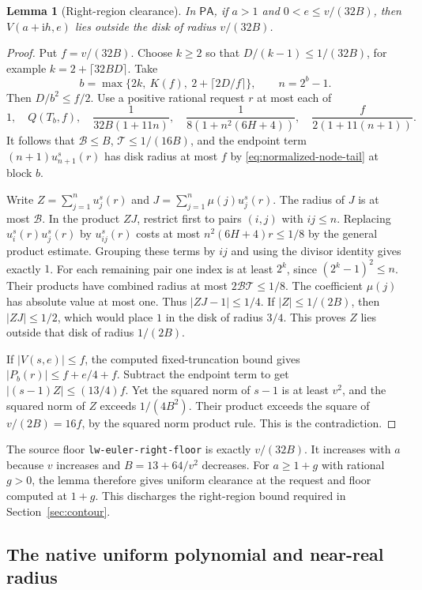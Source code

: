 \documentclass[11pt]{amsart}
\newtheorem{lemma}[theorem]{Lemma}
\theoremstyle{definition}
\theoremstyle{remark}
\numberwithin{equation}{section}
\newcommand{\PA}{\mathsf{PA}}
\newcommand{\code}[1]{\nolinkurl{#1}}
\begin{document}
\begin{lemma}[Right-region clearance]\label{lem:right-clearance}
In $\PA$, if $a>1$ and $0<e\le v/(32B)$, then
$V(a+\mathrm i h,e)$ lies outside the disk of radius $v/(32B)$.
\end{lemma}
\begin{proof}
Put $f=v/(32B)$. Choose $k\ge2$ so that
$D/(k-1)\le1/(32B)$, for example
$k=2+\lceil32BD\rceil$.
Take
\[
 b=\max\{2k,\ K(f),\ 2+\lceil 2D/f\rceil\},\qquad
 n=2^b-1 .
\]
Then $D/b^2\le f/2$. Use a positive rational request $r$
at most each of
\[
 1,\quad Q(T_b,f),\quad
 \frac{1}{32B(1+11n)},\quad
 \frac{1}{8(1+n^2(6H+4))},\quad
 \frac{f}{2(1+11(n+1))}.
\]
It follows that $\mathcal B\le B$, $\mathcal T\le1/(16B)$,
and the endpoint term $(n+1)u_{n+1}^s(r)$ has disk radius
at most $f$ by \eqref{eq:normalized-node-tail} at block $b$.

Write $Z=\sum_{j=1}^n u_j^s(r)$ and
$J=\sum_{j=1}^n\mu(j)u_j^s(r)$. The radius of $J$ is at
most $\mathcal B$. In the product $ZJ$, restrict first to
pairs $(i,j)$ with $ij\le n$. Replacing $u_i^s(r)u_j^s(r)$
by $u_{ij}^s(r)$ costs at most $n^2(6H+4)r\le1/8$ by
the general product estimate. Grouping these terms by $ij$
and using the divisor identity gives exactly $1$.
For each remaining pair one index is at least $2^k$,
since $(2^k-1)^2\le n$. Their products have combined
radius at most $2\mathcal B\mathcal T\le1/8$.
The coefficient $\mu(j)$ has absolute value at most one.
Thus $|ZJ-1|\le1/4$. If $|Z|\le1/(2B)$, then
$|ZJ|\le1/2$, which would place $1$ in the disk of radius
$3/4$. This proves $Z$ lies outside that disk of radius $1/(2B)$.

If $|V(s,e)|\le f$, the computed fixed-truncation bound
gives $|P_b(r)|\le f+e/4+f$. Subtract the endpoint term
to get $|(s-1)Z|\le(13/4)f$. Yet the squared norm of
$s-1$ is at least $v^2$, and the squared norm of $Z$ exceeds
$1/(4B^2)$. Their product exceeds the square of $v/(2B)=16f$,
by the squared norm product rule. This is the contradiction.
\end{proof}

The source floor \code{lw-euler-right-floor} is exactly
$v/(32B)$. It increases with $a$ because $v$ increases and
$B=13+64/v^2$ decreases. For $a\ge1+g$ with rational $g>0$,
the lemma therefore gives uniform clearance at the request
and floor computed at $1+g$. This discharges the right-region
bound required in Section~\ref{sec:contour}.

\subsection{The native uniform polynomial and near-real radius}
\label{sec:native-uniform-polynomial}
\end{document}
